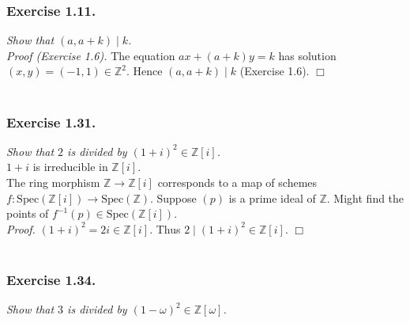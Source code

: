 \documentclass{article}
\begin{document}



\subsubsection*{Exercise 1.11.}
\emph{Show that $(a,a+k) \mid k$.} \\

\emph{Proof (Exercise 1.6).}
The equation $ax + (a+k)y = k$ has solution $(x,y) = (-1,1) \in \mathbb{Z}^2$.
Hence $(a,a+k) \mid k$ (Exercise 1.6).
$\Box$ \\\\






\subsubsection*{Exercise 1.31.}
\emph{Show that $2$ is divided by $(1+i)^2 \in \mathbb{Z}[i]$.} \\

$1+i$ is irreducible in $\mathbb{Z}[i]$. \\

The ring morphism $\mathbb{Z} \rightarrow \mathbb{Z}[i]$
corresponds to a map of schemes
$f: \text{Spec}(\mathbb{Z}[i]) \rightarrow \text{Spec}(\mathbb{Z})$.
Suppose $(p)$ is a prime ideal of $\mathbb{Z}$.
Might find the points of $f^{-1}(p) \in \text{Spec}(\mathbb{Z}[i])$. \\

\emph{Proof.}
$(1+i)^2 = 2i \in \mathbb{Z}[i]$.
Thus $2 \mid (1+i)^2 \in \mathbb{Z}[i]$.
$\Box$ \\\\






\subsubsection*{Exercise 1.34.}
\emph{Show that $3$ is divided by $(1-\omega)^2 \in \mathbb{Z}[\omega]$.} \\
\end{document}
